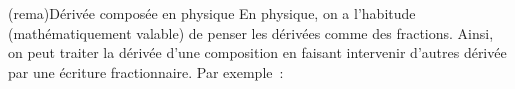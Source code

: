 \documentclass[../../main/main.tex]{subfiles}
\begin{document}
\begin{tcb*}[breakable](rema){Dérivée composée en physique}
  En physique, on a l'habitude (mathématiquement valable) de penser les dérivées
  comme des fractions. Ainsi, on peut traiter la dérivée d'une composition en
  faisant intervenir d'autres dérivée par une écriture fractionnaire. Par
  exemple~:

\end{tcb*}
\end{document}

